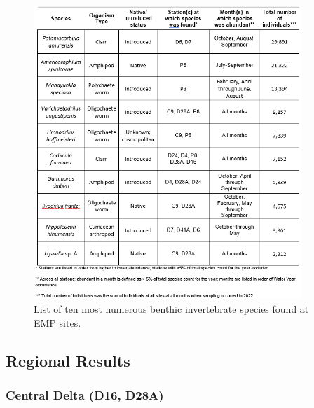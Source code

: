 \documentclass[
]{article}
\begin{document}
\begin{figure}

{\centering \includegraphics[width=0.9\textwidth,height=\textheight]{../figures/species_list.png}

}

\caption{\label{fig-abund}List of ten most numerous benthic invertebrate
species found at EMP sites.}

\end{figure}

\hypertarget{regional-results}{%
\subsection{Regional Results}\label{regional-results}}

\hypertarget{central-delta-d16-d28a}{%
\subsubsection{Central Delta (D16, D28A)}\label{central-delta-d16-d28a}}
\end{document}
